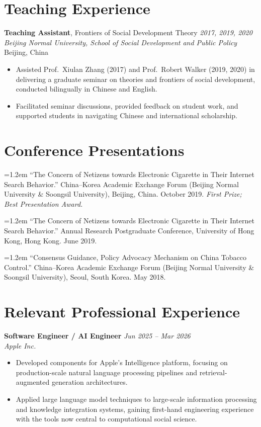 \documentclass[11pt, letterpaper]{article}
\newcommand{\pubentry}[1]{%
  \noindent\hangindent=1.2em\hangafter=1 #1\par\vspace{4pt}
}
\begin{document}
\section{Teaching Experience}

\noindent\textbf{Teaching Assistant}, Frontiers of Social Development Theory
\hfill \textit{2017, 2019, 2020}\\
\textit{Beijing Normal University, School of Social Development and Public Policy}
\hfill Beijing, China
\begin{itemize}
  \item Assisted Prof.\ Xiulan Zhang (2017) and Prof.\ Robert Walker (2019, 2020)
        in delivering a graduate seminar on theories and frontiers of social
        development, conducted bilingually in Chinese and English.
  \item Facilitated seminar discussions, provided feedback on student work,
        and supported students in navigating Chinese and international scholarship.
\end{itemize}

\section{Conference Presentations}

\pubentry{``The Concern of Netizens towards Electronic Cigarette in Their
Internet Search Behavior.''
China--Korea Academic Exchange Forum (Beijing Normal University \& Soongsil University),
Beijing, China. October 2019.
\textit{First Prize; Best Presentation Award.}}

\pubentry{``The Concern of Netizens towards Electronic Cigarette in
Their Internet Search Behavior.''
Annual Research Postgraduate Conference, University of Hong Kong,
Hong Kong. June 2019.}

\pubentry{``Consensus Guidance, Policy Advocacy Mechanism on China Tobacco Control.''
China--Korea Academic Exchange Forum (Beijing Normal University \& Soongsil University),
Seoul, South Korea. May 2018.}

\section{Relevant Professional Experience}

\noindent\textbf{Software Engineer / AI Engineer}
\hfill \textit{Jun 2025 -- Mar 2026}\\
\textit{Apple Inc.}
\begin{itemize}
  \item Developed components for Apple's Intelligence platform, focusing on
        production-scale natural language processing pipelines and
        retrieval-augmented generation architectures.
  \item Applied large language model techniques to large-scale information
        processing and knowledge integration systems, gaining first-hand
        engineering experience with the tools now central to computational
        social science.
\end{itemize}
\end{document}
